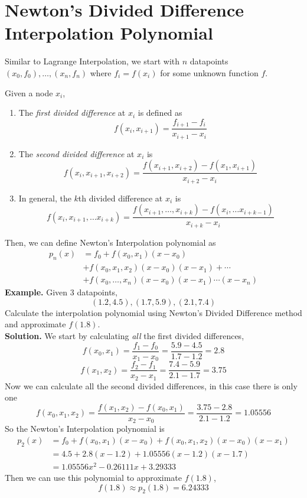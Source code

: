 \documentclass[openany]{report}
\begin{document}
\section{Newton's Divided Difference Interpolation Polynomial}
Similar to Lagrange Interpolation, we start with $n$ datapoints $(x_0,f_0),\ldots,(x_n,f_n)$ where $f_i = f(x_i)$ for some unknown function $f$. 
\begin{definition}
    Given a node $x_i$, 
    \begin{enumerate}
        \item The \emph{first divided difference} at $x_i$ is defined as 
        \[f(x_i,x_{i+1}) = \frac{f_{i+1}- f_i}{x_{i+1} - x_i}\]
        \item The \emph{second divided difference} at $x_i$ is 
        \[f(x_i, x_{i+1}, x_{i+2}) = \frac{f(x_{i+1}, x_{i+2}) - f(x_1,x_{i+1})}{x_{i+2}-x_i}\]
        \item In general, the $k$th divided difference at $x_i$ is 
        \[f(x_i, x_{i+1}, \ldots x_{i+k}) = \frac{f(x_{i+1},\ldots, x_{i+k}) - f(x_i, \ldots x_{i+k-1})}{x_{i+k}-x_i}\]
    \end{enumerate}
\end{definition}

Then, we can define Newton's Interpolation polynomial as 
\begin{align*}
    p_n(x) &= f_0 + f(x_0,x_1)(x-x_0)\\
    &+ f(x_0,x_1,x_2)(x-x_0)(x-x_1) + \cdots\\
    &+ f(x_0,\ldots,x_n)(x-x_0)(x-x_1)\cdots(x - x_n)
\end{align*}
\textbf{Example.} Given 3 datapoints, 
\[(1.2, 4.5), (1.7,5.9), (2.1,7.4) \]
Calculate the interpolation polynomial using Newton's Divided Difference method and approximate $f(1.8)$.\\[2ex]
\textbf{Solution.} We start by calculating \emph{all} the first divided differences,
\[f(x_0, x_1) = \frac{f_1 - f_0}{x_1 - x_0} = \frac{5.9-4.5}{1.7-1.2} = 2.8\]
\[f(x_1,x_2) = \frac{f_2-f_1}{x_2-x_1}=\frac{7.4-5.9}{2.1-1.7} = 3.75\]
Now we can calculate all the second divided differences, in this case there is only one 
\[f(x_0,x_1,x_2) = \frac{f(x_1, x_2) - f(x_0,x_1)}{x_2-x_0} = \frac{3.75 - 2.8}{2.1 - 1.2} = 1.05556\]
So the Newton's Interpolation polynomial is
\begin{align*}
    p_2(x) &= f_0 + f(x_0,x_1)(x-x_0) + f(x_0,x_1,x_2)(x-x_0)(x-x_1)\\
    &= 4.5 + 2.8(x-1.2) + 1.05556(x-1.2)(x-1.7)\\
    &= 1.05556x^2 - 0.26111x + 3.29333
\end{align*}
Then we can use this polynomial to approximate $f(1.8)$,
\[f(1.8) \approx p_2(1.8) = 6.24333\]
\end{document}
